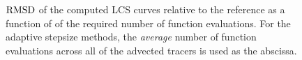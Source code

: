 \begin{figure}[htpb]
    \centering
    
    \caption[$\rmsd$ of the computed LCS curves relative to the reference as a
    function of the required number of function evaluations]
    {$\rmsd$ of the computed LCS curves relative to the reference as a
        function of of the required number of function evaluations. For the
        adaptive stepsize methods, the \emph{average} number of function
    evaluations across all of the advected tracers is used as the abscissa.}
    \label{fig:lcs_rmsd_fp_nn_both}
\end{figure}
